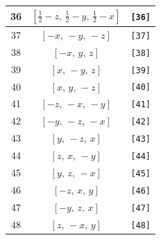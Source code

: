 \documentclass[fleqn,8pt]{jsarticle}
\begin{document}
\begin{longtable}{ccc}
36 & $\left[ \frac{1}{2} - z,\, \frac{1}{2} - y,\, \frac{1}{2} - x \right]$ & {\tt [36]} \\ \hline
37 & $\left[ - x,\, - y,\, - z \right]$ & {\tt [37]} \\ \hline
38 & $\left[ - x,\, y,\, z \right]$ & {\tt [38]} \\ \hline
39 & $\left[ x,\, - y,\, z \right]$ & {\tt [39]} \\ \hline
40 & $\left[ x,\, y,\, - z \right]$ & {\tt [40]} \\ \hline
41 & $\left[ - z,\, - x,\, - y \right]$ & {\tt [41]} \\ \hline
42 & $\left[ - y,\, - z,\, - x \right]$ & {\tt [42]} \\ \hline
43 & $\left[ y,\, - z,\, x \right]$ & {\tt [43]} \\ \hline
44 & $\left[ z,\, x,\, - y \right]$ & {\tt [44]} \\ \hline
45 & $\left[ y,\, z,\, - x \right]$ & {\tt [45]} \\ \hline
46 & $\left[ - z,\, x,\, y \right]$ & {\tt [46]} \\ \hline
47 & $\left[ - y,\, z,\, x \right]$ & {\tt [47]} \\ \hline
48 & $\left[ z,\, - x,\, y \right]$ & {\tt [48]} \\
\end{longtable}
\end{document}
